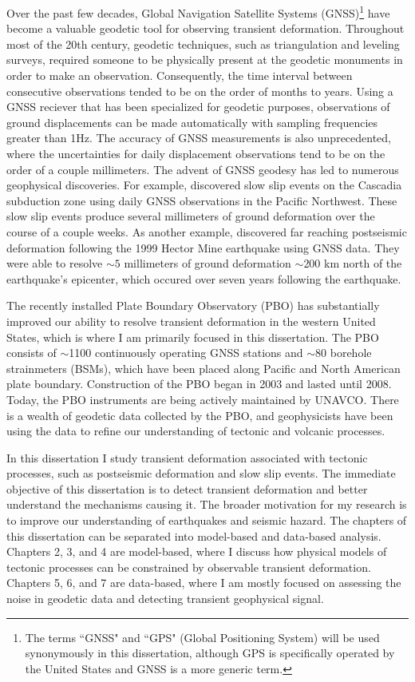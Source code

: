 Over the past few decades, Global Navigation Satellite Systems
(GNSS)\footnote{The terms ``GNSS" and ``GPS" (Global Positioning
System) will be used synonymously in this dissertation, although GPS
is specifically operated by the United States and GNSS is a more
generic term.} have become a valuable geodetic tool for observing
transient deformation. Throughout most of the 20th century, geodetic
techniques, such as triangulation and leveling surveys, required
someone to be physically present at the geodetic monuments in order to
make an observation. Consequently, the time interval between
consecutive observations tended to be on the order of months to years.
Using a GNSS reciever that has been specialized for geodetic purposes,
observations of ground displacements can be made automatically with
sampling frequencies greater than 1Hz. The accuracy of GNSS
measurements is also unprecedented, where the uncertainties for daily
displacement observations tend to be on the order of a couple
millimeters. The advent of GNSS geodesy has led to numerous
geophysical discoveries. For example, \citet{Dragert2001} discovered
slow slip events on the Cascadia subduction zone using daily GNSS
observations in the Pacific Northwest. These slow slip events produce
several millimeters of ground deformation over the course of a couple
weeks. As another example, \citet{Freed2007} discovered far reaching
postseismic deformation following the 1999 Hector Mine earthquake
using GNSS data. They were able to resolve ${\sim}5$ millimeters of
ground deformation ${\sim}$200 km north of the earthquake's epicenter,
which occured over seven years following the earthquake.

The recently installed Plate Boundary Observatory (PBO) has
substantially improved our ability to resolve transient deformation in
the western United States, which is where I am primarily focused in
this dissertation. The PBO consists of ${\sim}$1100 continuously
operating GNSS stations and ${\sim}$80 borehole strainmeters (BSMs),
which have been placed along Pacific and North American plate
boundary. Construction of the PBO began in 2003 and lasted until 2008.
Today, the PBO instruments are being actively maintained by UNAVCO.
There is a wealth of geodetic data collected by the PBO, and
geophysicists have been using the data to refine our understanding of
tectonic and volcanic processes.

In this dissertation I study transient deformation associated with
tectonic processes, such as postseismic deformation and slow slip
events. The immediate objective of this dissertation is to detect
transient deformation and better understand the mechanisms causing it.
The broader motivation for my research is to improve our understanding
of earthquakes and seismic hazard. The chapters of this dissertation
can be separated into model-based and data-based analysis. Chapters 2,
3, and 4 are model-based, where I discuss how physical models of
tectonic processes can be constrained by observable transient
deformation. Chapters 5, 6, and 7 are data-based, where I am mostly
focused on assessing the noise in geodetic data and detecting
transient geophysical signal.

